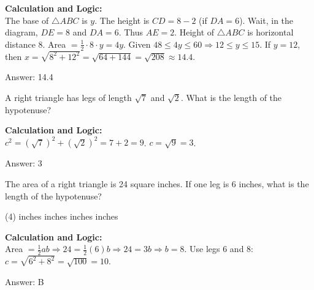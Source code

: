 \documentclass[11pt,paper=a4,answers]{exam}
\begin{document}
\begin{questions}
\begin{solution}
\textbf{Calculation and Logic:} \\
The base of $\triangle ABC$ is $y$. The height is $CD = 8 - 2$ (if $DA=6$). Wait, in the diagram, $DE=8$ and $DA=6$. Thus $AE=2$. Height of $\triangle ABC$ is horizontal distance 8. Area $= \frac{1}{2} \cdot 8 \cdot y = 4y$. Given $48 \le 4y \le 60 \Rightarrow 12 \le y \le 15$. If $y=12$, then $x = \sqrt{8^2 + 12^2} = \sqrt{64+144} = \sqrt{208} \approx 14.4$. 

\vspace{30pt}

Answer: \colorbox{yellow!100}{14.4}
\end{solution}

\vspace{60pt}

\question
A right triangle has legs of length $\sqrt{7}$ and $\sqrt{2}$. What is the length of the hypotenuse?

\begin{solution}
\textbf{Calculation and Logic:} \\
$c^2 = (\sqrt{7})^2 + (\sqrt{2})^2 = 7 + 2 = 9$. $c = \sqrt{9} = 3$.

\vspace{30pt}

Answer: \colorbox{yellow!100}{3}
\end{solution}

\vspace{60pt}

\question
The area of a right triangle is 24 square inches. If one leg is 6 inches, what is the length of the hypotenuse?
\begin{tasks}(4)
     inches
     inches
     inches
     inches
\end{tasks}

\begin{solution}
\textbf{Calculation and Logic:} \\
Area $= \frac{1}{2}ab \Rightarrow 24 = \frac{1}{2}(6)b \Rightarrow 24 = 3b \Rightarrow b = 8$. Use legs 6 and 8: $c = \sqrt{6^2 + 8^2} = \sqrt{100} = 10$.

\vspace{30pt}

Answer: \colorbox{yellow!100}{B}
\end{solution}


\end{questions}
\end{document}
